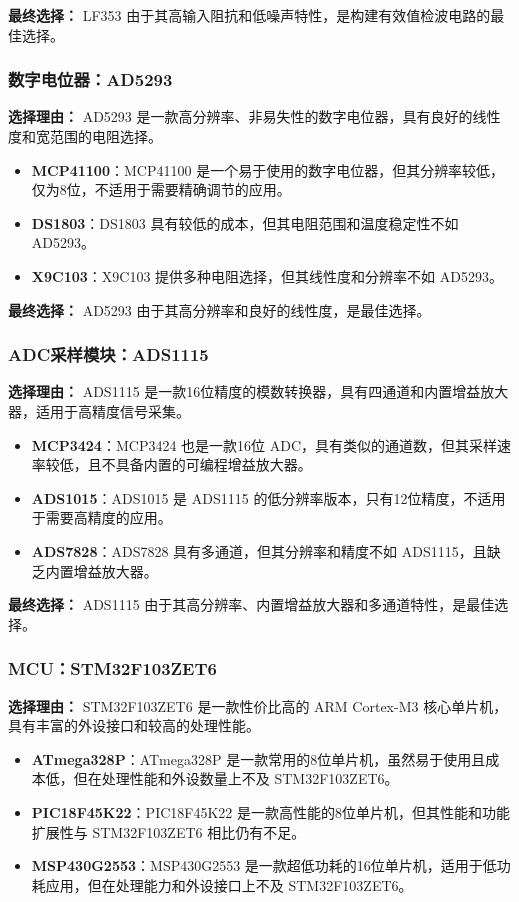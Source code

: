 \documentclass[lang=cn,11pt,a4paper]{elegantpaper}
\begin{document}
\textbf{最终选择：} LF353 由于其高输入阻抗和低噪声特性，是构建有效值检波电路的最佳选择。

\subsubsection{数字电位器：AD5293}
\textbf{选择理由：} AD5293 是一款高分辨率、非易失性的数字电位器，具有良好的线性度和宽范围的电阻选择。

\begin{itemize}
  \item \textbf{MCP41100}：MCP41100 是一个易于使用的数字电位器，但其分辨率较低，仅为8位，不适用于需要精确调节的应用。
  \item \textbf{DS1803}：DS1803 具有较低的成本，但其电阻范围和温度稳定性不如 AD5293。
  \item \textbf{X9C103}：X9C103 提供多种电阻选择，但其线性度和分辨率不如 AD5293。
\end{itemize}

\textbf{最终选择：} AD5293 由于其高分辨率和良好的线性度，是最佳选择。

\subsubsection{ADC采样模块：ADS1115}
\textbf{选择理由：} ADS1115 是一款16位精度的模数转换器，具有四通道和内置增益放大器，适用于高精度信号采集。

\begin{itemize}
  \item \textbf{MCP3424}：MCP3424 也是一款16位 ADC，具有类似的通道数，但其采样速率较低，且不具备内置的可编程增益放大器。
  \item \textbf{ADS1015}：ADS1015 是 ADS1115 的低分辨率版本，只有12位精度，不适用于需要高精度的应用。
  \item \textbf{ADS7828}：ADS7828 具有多通道，但其分辨率和精度不如 ADS1115，且缺乏内置增益放大器。
\end{itemize}

\textbf{最终选择：} ADS1115 由于其高分辨率、内置增益放大器和多通道特性，是最佳选择。

\subsubsection{MCU：STM32F103ZET6}
\textbf{选择理由：} STM32F103ZET6 是一款性价比高的 ARM Cortex-M3 核心单片机，具有丰富的外设接口和较高的处理性能。

\begin{itemize}
  \item \textbf{ATmega328P}：ATmega328P 是一款常用的8位单片机，虽然易于使用且成本低，但在处理性能和外设数量上不及 STM32F103ZET6。
  \item \textbf{PIC18F45K22}：PIC18F45K22 是一款高性能的8位单片机，但其性能和功能扩展性与 STM32F103ZET6 相比仍有不足。
  \item \textbf{MSP430G2553}：MSP430G2553 是一款超低功耗的16位单片机，适用于低功耗应用，但在处理能力和外设接口上不及 STM32F103ZET6。
\end{itemize}
\end{document}
